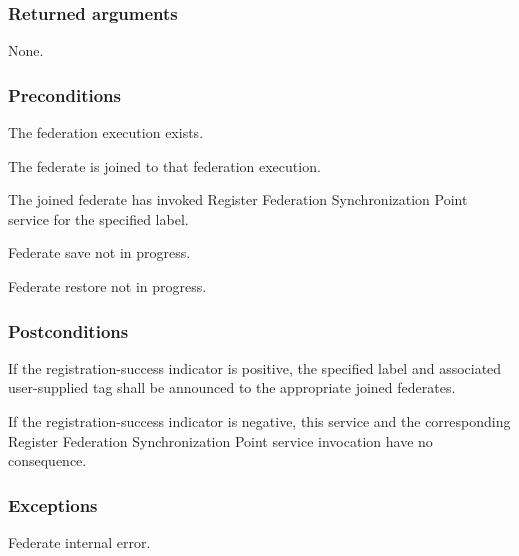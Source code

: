 \subsubsection{Returned arguments}

\begin{stdalphalist}
    \item None.
\end{stdalphalist}

\subsubsection{Preconditions}

\begin{stdalphalist}
    \item The federation execution exists.
    \item The federate is joined to that federation execution.
    \item The joined federate has invoked Register Federation Synchronization Point service for the specified label.
    \item Federate save not in progress.
    \item Federate restore not in progress.
\end{stdalphalist}

\subsubsection{Postconditions}

\begin{stdalphalist}
    \item If the registration-success indicator is positive, the specified label and associated user-supplied tag shall be announced to the appropriate joined federates.
    \item If the registration-success indicator is negative, this service and the corresponding Register Federation Synchronization Point service invocation have no consequence.
\end{stdalphalist}

\clearpage


\subsubsection{Exceptions}

\begin{stdalphalist}
    \item Federate internal error.
\end{stdalphalist}

